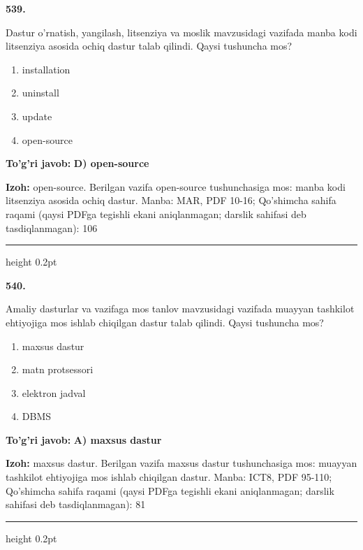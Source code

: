 \documentclass[10pt,a4paper]{article}
\begin{document}
{\bfseries\sffamily\color{ink} 539.}
\par
Dastur o'rnatish, yangilash, litsenziya va moslik mavzusidagi vazifada manba kodi litsenziya asosida ochiq dastur talab qilindi. Qaysi tushuncha mos?
\begin{enumerate}[label=\Alph*),leftmargin=9mm]
\item installation
\item uninstall
\item update
\item open-source
\end{enumerate}
\begin{tcolorbox}[enhanced,breakable,colback=teal!4,colframe=teal!60!black,boxrule=0.45pt,arc=1.2mm,left=2.7mm,right=2.7mm,top=1.8mm,bottom=1.8mm,before skip=2mm,after skip=2mm]
{\bfseries\sffamily\color{teal}To'g'ri javob:} \textbf{D) open-source}
\par\smallskip
{\bfseries Izoh:} open-source. Berilgan vazifa open-source tushunchasiga mos: manba kodi litsenziya asosida ochiq dastur. Manba: MAR, PDF 10-16; Qo'shimcha sahifa raqami (qaysi PDFga tegishli ekani aniqlanmagan; darslik sahifasi deb tasdiqlanmagan): 106
\end{tcolorbox}
\vspace{2mm}\hrule height 0.2pt\vspace{3mm}

{\bfseries\sffamily\color{ink} 540.}
\par
Amaliy dasturlar va vazifaga mos tanlov mavzusidagi vazifada muayyan tashkilot ehtiyojiga mos ishlab chiqilgan dastur talab qilindi. Qaysi tushuncha mos?
\begin{enumerate}[label=\Alph*),leftmargin=9mm]
\item maxsus dastur
\item matn protsessori
\item elektron jadval
\item DBMS
\end{enumerate}
\begin{tcolorbox}[enhanced,breakable,colback=teal!4,colframe=teal!60!black,boxrule=0.45pt,arc=1.2mm,left=2.7mm,right=2.7mm,top=1.8mm,bottom=1.8mm,before skip=2mm,after skip=2mm]
{\bfseries\sffamily\color{teal}To'g'ri javob:} \textbf{A) maxsus dastur}
\par\smallskip
{\bfseries Izoh:} maxsus dastur. Berilgan vazifa maxsus dastur tushunchasiga mos: muayyan tashkilot ehtiyojiga mos ishlab chiqilgan dastur. Manba: ICT8, PDF 95-110; Qo'shimcha sahifa raqami (qaysi PDFga tegishli ekani aniqlanmagan; darslik sahifasi deb tasdiqlanmagan): 81
\end{tcolorbox}
\vspace{2mm}\hrule height 0.2pt\vspace{3mm}
\end{document}
